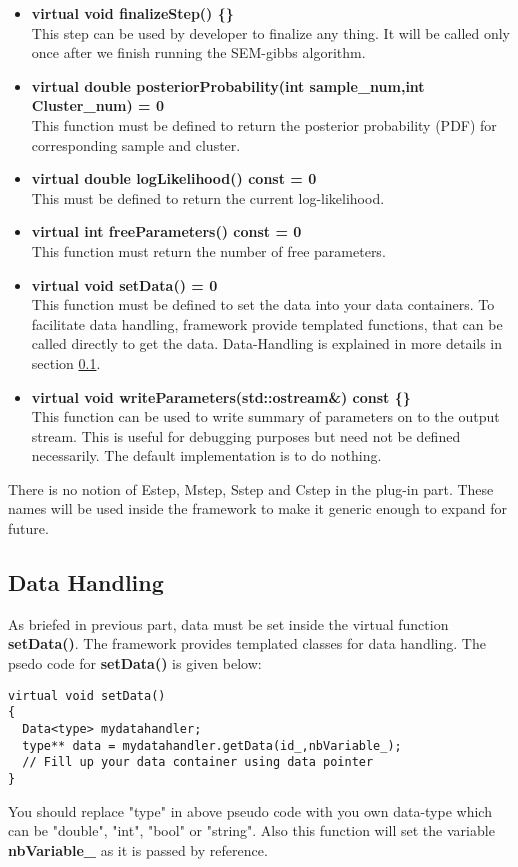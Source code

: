 \documentclass[a4paper,11pt]{article}
\begin{document}
\begin{itemize}
\item {\bf virtual void finalizeStep() \{\}}\\
This step can be used by developer to finalize any thing. It will be called only once after we
finish running the SEM-gibbs algorithm.
\item {\bf virtual double posteriorProbability(int sample\_num,int Cluster\_num) = 0}\\
This function must be defined to return the posterior probability (PDF) for corresponding sample and cluster.
\item {\bf virtual double logLikelihood() const = 0}\\
This must be defined to return the current log-likelihood.
\item {\bf virtual int freeParameters() const = 0}\\
This function must return the number of free parameters.
\item {\bf virtual void setData() = 0}\\
This function must be defined to set the data into your data containers. To facilitate data handling, framework provide templated functions,
that can be called directly to get the data. Data-Handling is explained in more details in section \ref{datahandling}.
\item {\bf virtual void writeParameters(std::ostream\&) const \{\}}\\
This function can be used to write summary of parameters on to the output stream. This is useful for debugging purposes but need not be defined necessarily. The
default implementation is to do nothing.
\end{itemize}

There is no notion of Estep, Mstep, Sstep and Cstep in the plug-in part. These names will be used inside the framework to make
it generic enough to expand for future. 

\subsection{Data Handling}
\label{datahandling}
As briefed in previous part, data must be set inside the virtual function {\bf setData()}. The framework provides templated classes for data handling. The 
psedo code for {\bf setData()} is given below:
\begin{lstlisting}
virtual void setData()
{
  Data<type> mydatahandler;
  type** data = mydatahandler.getData(id_,nbVariable_);
  // Fill up your data container using data pointer
}
\end{lstlisting}
You should replace "type" in above pseudo code with you own data-type which can be {"double", "int", "bool" or "string"}. Also this function will set the variable {\bf nbVariable\_} as it is passed by reference.
\end{document}
